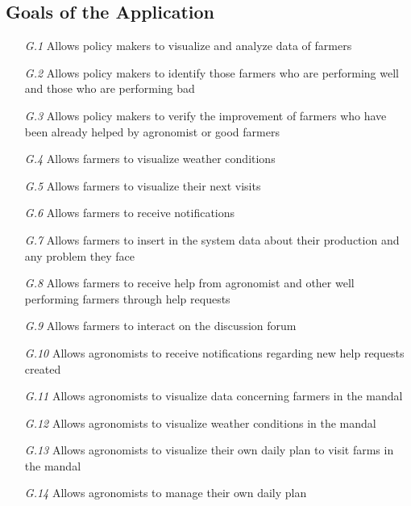 \subsection{Goals of the Application}
\begin{itemize}
    \item [\textit {G.1}] Allows policy makers to visualize and analyze data of farmers
    \item [\textit {G.2}] Allows policy makers to identify those farmers who are performing well and those who are performing bad
    \item [\textit {G.3}] Allows policy makers to verify the improvement of farmers who have been already helped by agronomist or good farmers
    \item [\textit {G.4}] Allows farmers to visualize weather conditions
    \item [\textit {G.5}] Allows farmers to visualize their next visits
    \item [\textit {G.6}] Allows farmers to receive notifications
    \item [\textit {G.7}] Allows farmers to insert in the system data about their production and any problem they face
    \item [\textit {G.8}] Allows farmers to receive help from agronomist and other well performing farmers through help requests
    \item [\textit {G.9}] Allows farmers to interact on the discussion forum
    \item [\textit {G.10}] Allows agronomists to receive notifications regarding new help requests created
    \item [\textit {G.11}] Allows agronomists to visualize data concerning farmers in the mandal
    \item [\textit {G.12}] Allows agronomists to visualize weather conditions in the mandal
    \item [\textit {G.13}] Allows agronomists to visualize their own daily plan to visit farms in the mandal
    \item [\textit {G.14}] Allows agronomists to manage their own daily plan

\end{itemize}